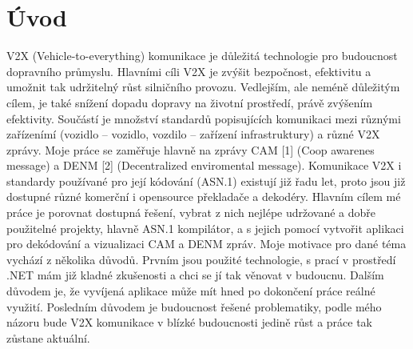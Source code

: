 \chapter{Úvod}
\setcounter{page}{1}




V2X (Vehicle-to-everything) komunikace je důležitá technologie pro budoucnost
dopravního průmyslu. Hlavními cíli V2X je zvýšit bezpočnost, efektivitu
a umožnit tak udržitelný růst silničního provozu. Vedlejším, ale neméně důležitým
cílem, je také snížení dopadu dopravy na životní prostředí, právě zvýšením
efektivity.
Součástí je množství standardů popisujících komunikaci mezi různými zařízenímí
(vozidlo – vozidlo, vozdilo – zařízení infrastruktury) a různé V2X zprávy.
Moje práce se zaměřuje hlavně na zprávy CAM [1] (Coop awarenes message)
a DENM [2] (Decentralized enviromental message).
Komunikace V2X i standardy používané pro její kódování (ASN.1) existují
již řadu let, proto jsou již dostupné různé komerční i opensource překladače
a dekodéry. Hlavním cílem mé práce je porovnat dostupná řešení, vybrat z nich
nejlépe udržované a dobře použitelné projekty, hlavně ASN.1 kompilátor, a s jejich
pomocí vytvořit aplikaci pro dekódování a vizualizaci CAM a DENM zpráv.
Moje motivace pro dané téma vychází z několika důvodů. Prvním jsou použité
technologie, s prací v prostředí .NET mám již kladné zkušenosti a chci
se jí tak věnovat v budoucnu. Dalším důvodem je, že vyvíjená aplikace může
mít hned po dokončení práce reálné využití. Posledním důvodem je budoucnost
řešené problematiky, podle mého názoru bude V2X komunikace v blízké
budoucnosti jedině růst a práce tak zůstane aktuální.

